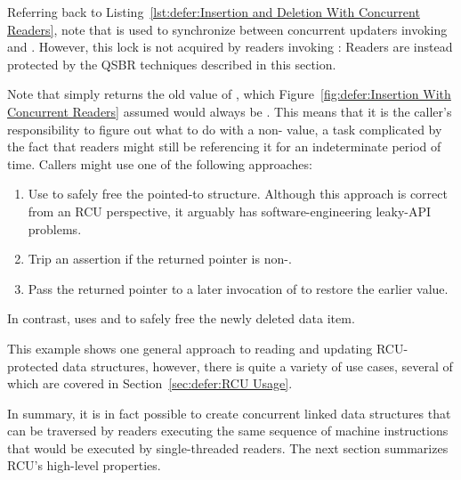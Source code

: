 Referring back to
Listing~\ref{lst:defer:Insertion and Deletion With Concurrent Readers},
note that  is used to synchronize between concurrent updaters
invoking  and .
However, this lock is not acquired by readers invoking :
Readers are instead protected by the QSBR techniques described in this section.

Note that  simply returns the old value of , which
Figure~\ref{fig:defer:Insertion With Concurrent Readers} assumed would
always be .
This means that it is the caller's responsibility to figure out what to
do with a non- value, a task complicated by the fact that
readers might still be referencing it for an indeterminate period of time.
Callers might use one of the following approaches:

\begin{enumerate}
\item	Use  to safely free the pointed-to structure.
	Although this approach is correct from an RCU perspective, it
	arguably has software-engineering leaky-API problems.
\item	Trip an assertion if the returned pointer is non-.
\item	Pass the returned pointer to a later invocation of
	 to restore the earlier value.
\end{enumerate}

In contrast,  uses  and
 to safely free the newly deleted data item.

\QuickQuizEnd

This example shows one general approach to reading and updating
RCU-protected data structures, however, there is quite a variety
of use cases, several of which are covered in
Section~\ref{sec:defer:RCU Usage}.

In summary, it is in fact possible to create concurrent linked data
structures that can be traversed by readers executing the same sequence
of machine instructions that would be executed by single-threaded readers.
The next section summarizes RCU's high-level properties.

